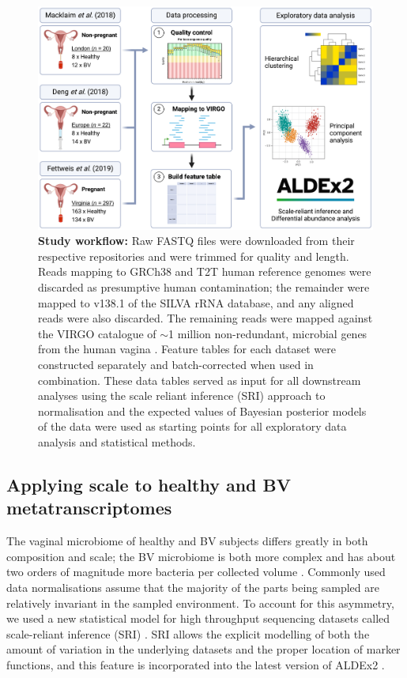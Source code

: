 \documentclass[sn-mathphys,Numbered]{sn-jnl}%
\begin{document}
\begin{figure}[H]%
    \centering
    \includegraphics[scale=0.65]{0_multipanel_fig1.png}
    \caption{\textbf{Study workflow:} Raw FASTQ files were downloaded from their respective repositories and were trimmed for quality and length. Reads mapping to GRCh38 and T2T human reference genomes were discarded as presumptive human contamination; the remainder were mapped to v138.1 of the SILVA rRNA database, and any aligned reads were also discarded. The remaining reads were mapped against the VIRGO catalogue of $\sim$1 million non-redundant, microbial genes from the human vagina \cite{Ma:2020aa}. Feature tables for each dataset were constructed separately and batch-corrected \cite{Zhang:2020ab} when used in combination. These data tables served as input for all downstream analyses using the scale reliant inference (SRI) approach to normalisation \cite{nixon2023scale} and the expected values of Bayesian posterior models of the data were used as starting points for all exploratory data analysis and statistical methods.} \label{fig:figWorkflow}
\end{figure}

\subsection{Applying scale to healthy and BV metatranscriptomes} 
The vaginal microbiome of healthy and BV subjects differs greatly in both composition and scale; the BV microbiome is both more complex and has about two orders of magnitude more bacteria per collected volume \citep{Zozaya:2010}. Commonly used data normalisations assume that the majority of the parts being sampled are relatively invariant in the sampled environment. To account for this asymmetry, we used a new statistical model for high throughput sequencing datasets called scale-reliant inference (SRI) \citep{nixon2023scale}. SRI allows the explicit modelling of both the amount of variation in the underlying datasets and the proper location of marker functions, and this feature is incorporated into the latest version of ALDEx2 \citep{fernandes:2014, gloorScale}. 
\end{document}
